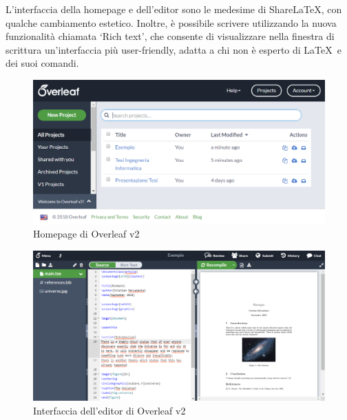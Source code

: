 L'interfaccia della homepage e dell'editor sono le medesime di ShareLaTeX, con qualche cambiamento estetico. Inoltre, è possibile scrivere utilizzando la nuova funzionalità chiamata \enquote*{Rich text}, che consente di visualizzare nella finestra di scrittura un'interfaccia più user-friendly, adatta a chi non è esperto di \LaTeX ~e dei suoi comandi.
\begin{figure}[h]
    \centering
    \includegraphics[width=\textwidth]{immagini/overleaf_homepage.PNG}
    \caption{Homepage di Overleaf v2}
    \label{fig:overleaf_homepage}
\end{figure}
\begin{figure}[h]
    \centering
    \includegraphics[width=\textwidth]{immagini/overleaf_editor.PNG}
    \caption{Interfaccia dell'editor di Overleaf v2}
    \label{fig:overleaf_editor}
\end{figure}

